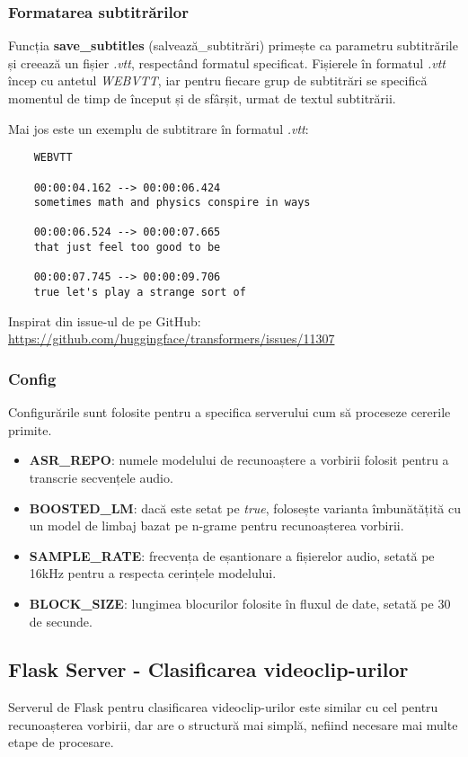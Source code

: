 \subsubsection{Formatarea subtitrărilor}
Funcția \textbf{save\_subtitles} (salvează\_subtitrări) primește ca parametru subtitrările și creează un fișier \textit{.vtt},
respectând formatul specificat. Fișierele în formatul \textit{.vtt} încep cu antetul \textit{WEBVTT},
iar pentru fiecare grup de subtitrări se specifică momentul de timp de început și de sfârșit, urmat
de textul subtitrării.
\par
Mai jos este un exemplu de subtitrare în formatul \textit{.vtt}:

\begin{verbatim}
    WEBVTT

    00:00:04.162 --> 00:00:06.424
    sometimes math and physics conspire in ways

    00:00:06.524 --> 00:00:07.665
    that just feel too good to be

    00:00:07.745 --> 00:00:09.706
    true let's play a strange sort of
\end{verbatim}


\par
Inspirat din issue-ul de pe GitHub: \url{https://github.com/huggingface/transformers/issues/11307}

\subsubsection{Config}
Configurările sunt folosite pentru a specifica serverului cum să proceseze cererile primite.
\begin{itemize}
    \item \textbf{ASR\_REPO}: numele modelului de recunoaștere a vorbirii folosit pentru a transcrie
    secvențele audio.
    \item \textbf{BOOSTED\_LM}: dacă este setat pe \textit{true}, folosește varianta îmbunătățită cu
    un model de limbaj bazat pe n-grame pentru recunoașterea vorbirii.
    \item \textbf{SAMPLE\_RATE}: frecvența de eșantionare a fișierelor audio, setată pe 16kHz pentru
    a respecta cerințele modelului.
    \item \textbf{BLOCK\_SIZE}: lungimea blocurilor folosite în fluxul de date, setată pe 30 de secunde.
\end{itemize}

\subsection{Flask Server - Clasificarea videoclip-urilor}
Serverul de Flask pentru clasificarea videoclip-urilor este similar cu cel pentru recunoașterea vorbirii,
dar are o structură mai simplă, nefiind necesare mai multe etape de procesare.
